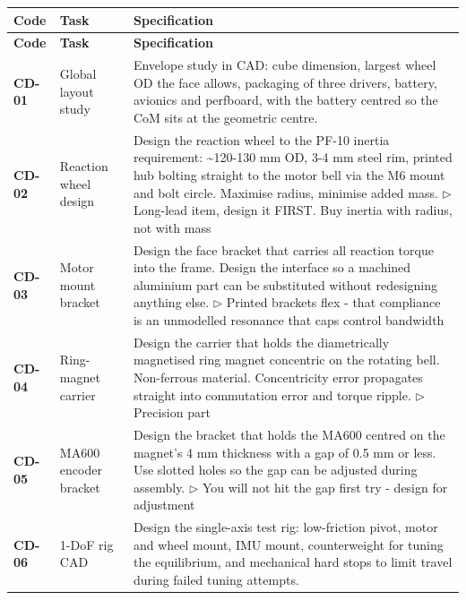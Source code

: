 {\small
\setlength{\tabcolsep}{4pt}%
\begin{longtable}{@{}L{1.1cm} L{3.0cm} L{11.0cm}@{}}
\toprule
\textbf{Code} & \textbf{Task} & \textbf{Specification} \\
\midrule\endfirsthead
\toprule
\textbf{Code} & \textbf{Task} & \textbf{Specification} \\
\midrule\endhead
\bottomrule\endfoot
\textbf{CD-01} & Global layout study & Envelope study in CAD: cube dimension, largest wheel OD the face allows, packaging of three drivers, battery, avionics and perfboard, with the battery centred so the CoM sits at the geometric centre. \\[2pt]
\textbf{CD-02} & Reaction wheel design & Design the reaction wheel to the PF-10 inertia requirement: \textasciitilde{}120-130 mm OD, 3-4 mm steel rim, printed hub bolting straight to the motor bell via the M6 mount and bolt circle. Maximise radius, minimise added mass. \newline\textcolor{p0col}{\footnotesize$\triangleright$ Long-lead item, design it FIRST. Buy inertia with radius, not with mass} \\[2pt]
\textbf{CD-03} & Motor mount bracket & Design the face bracket that carries all reaction torque into the frame. Design the interface so a machined aluminium part can be substituted without redesigning anything else. \newline\textcolor{p0col}{\footnotesize$\triangleright$ Printed brackets flex - that compliance is an unmodelled resonance that caps control bandwidth} \\[2pt]
\textbf{CD-04} & Ring-magnet carrier & Design the carrier that holds the diametrically magnetised ring magnet concentric on the rotating bell. Non-ferrous material. Concentricity error propagates straight into commutation error and torque ripple. \newline\textcolor{p0col}{\footnotesize$\triangleright$ Precision part} \\[2pt]
\textbf{CD-05} & MA600 encoder bracket & Design the bracket that holds the MA600 centred on the magnet's 4 mm thickness with a gap of 0.5 mm or less. Use slotted holes so the gap can be adjusted during assembly. \newline\textcolor{p0col}{\footnotesize$\triangleright$ You will not hit the gap first try - design for adjustment} \\[2pt]
\textbf{CD-06} & 1-DoF rig CAD & Design the single-axis test rig: low-friction pivot, motor and wheel mount, IMU mount, counterweight for tuning the equilibrium, and mechanical hard stops to limit travel during failed tuning attempts. \\[2pt]

\end{longtable}}
